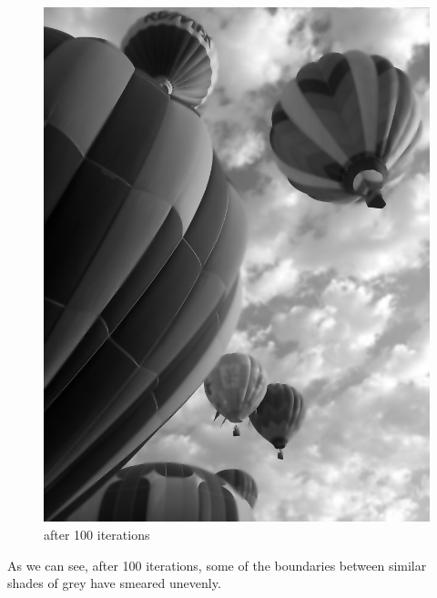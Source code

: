 \begin{figure}[ht]
\begin{minipage}[b]{0.45\linewidth}
\includegraphics[width=\textwidth]{baloons100}
\caption*{after 100 iterations}
\end{minipage}
\end{figure}

As we can see, after 100 iterations, some of the boundaries between similar shades of grey have smeared unevenly.

